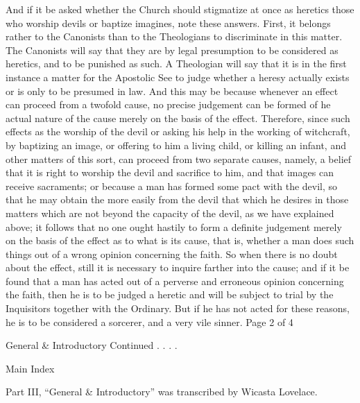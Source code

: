              And if it be asked whether the Church should stigmatize at once as heretics those who
       worship devils or baptize imagines, note these answers. First, it belongs rather to the
       Canonists than to the Theologians to discriminate in this matter. The Canonists will say that
       they are by legal presumption to be considered as heretics, and to be punished as such. A
       Theologian will say that it is in the first instance a matter for the Apostolic See to judge
       whether a heresy actually exists or is only to be presumed in law. And this may be because
       whenever an effect can proceed from a twofold cause, no precise judgement can be formed
       of he actual nature of the cause merely on the basis of the effect.
             Therefore, since such effects as the worship of the devil or asking his help in the
       working of witchcraft, by baptizing an image, or offering to him a living child, or killing an
       infant, and other matters of this sort, can proceed from two separate causes, namely, a belief
       that it is right to worship the devil and sacrifice to him, and that images can receive
       sacraments; or because a man has formed some pact with the devil, so that he may obtain
       the more easily from the devil that which he desires in those matters which are not beyond
       the capacity of the devil, as we have explained above; it follows that no one ought hastily to
       form a definite judgement merely on the basis of the effect as to what is its cause, that is,
       whether a man does such things out of a wrong opinion concerning the faith. So when there
       is no doubt about the effect, still it is necessary to inquire farther into the cause; and if it be
       found that a man has acted out of a perverse and erroneous opinion concerning the faith,
       then he is to be judged a heretic and will be subject to trial by the Inquisitors together with
       the Ordinary. But if he has not acted for these reasons, he is to be considered a sorcerer, and
       a very vile sinner.
                                                                 Page 2 of 4


                                         General & Introductory Continued . . . .

                                                        Main Index



                                                 Part III, “General & Introductory”
                                               was transcribed by Wicasta Lovelace.

